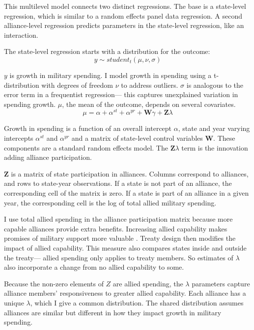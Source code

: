 \documentclass[12pt]{article}
\begin{document}
This multilevel model connects two distinct regressions. 
The base is a state-level regression, which is similar to a random effects panel data regression.
A second alliance-level regression predicts parameters in the state-level regression, like an interaction. 


The state-level regression starts with a distribution for the outcome:
\begin{equation}
y \sim student_t(\mu, \nu, \sigma)
\end{equation}
 
$y$ is growth in military spending. 
I model growth in spending using a t-distribution with degrees of freedom $\nu$ to address outliers.
$\sigma$ is analogous to the error term in a frequentist regression--- this captures unexplained variation in spending growth.  
$\mu$, the mean of the outcome, depends on several covariates.
\begin{equation}
\mu = \alpha + \alpha^{st} + \alpha^{yr} +\textbf{W} \gamma + \textbf{Z} \lambda
\end{equation}


Growth in spending is a function of an overall intercept $\alpha$, state and year varying intercepts $\alpha^{st}$ and $\alpha^{yr}$ and a matrix of state-level control variables $\textbf{W}$.
These components are a standard random effects model. 
The $\textbf{Z} \lambda$ term is the innovation adding alliance participation.


$\textbf{Z}$ is a matrix of state participation in alliances. 
Columns correspond to alliances, and rows to state-year observations. 
If a state is not part of an alliance, the corresponding cell of the matrix is zero.
If a state is part of an alliance in a given year, the corresponding cell is the log of total allied military spending. 


I use total allied spending in the alliance participation matrix because more capable alliances provide extra benefits.
Increasing allied capability makes promises of military support more valuable \citep{Johnsonetal2015}.  
Treaty design then modifies the impact of allied capability.   
This measure also compares states inside and outside the treaty--- allied spending only applies to treaty members. 
So estimates of $\lambda$ also incorporate a change from no allied capability to some. 

Because the non-zero elements of $Z$ are allied spending, the $\lambda$ parameters capture alliance members' responsiveness to greater allied capability. 
Each alliance has a unique $\lambda$, which I give a common distribution. 
The shared distribution assumes alliances are similar but different in how they impact growth in military spending. 
\end{document}
